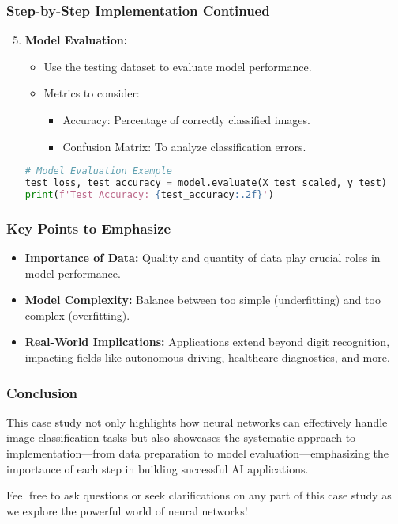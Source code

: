 \documentclass[aspectratio=169]{beamer}
\begin{document}
\begin{frame}[fragile]
    \frametitle{Step-by-Step Implementation Continued}
    \begin{enumerate}
        \setcounter{enumi}{4}
        \item \textbf{Model Evaluation:}
            \begin{itemize}
                \item Use the testing dataset to evaluate model performance.
                \item Metrics to consider:
                \begin{itemize}
                    \item Accuracy: Percentage of correctly classified images.
                    \item Confusion Matrix: To analyze classification errors.
                \end{itemize}
            \end{itemize}
            \begin{lstlisting}[language=Python]
# Model Evaluation Example
test_loss, test_accuracy = model.evaluate(X_test_scaled, y_test)
print(f'Test Accuracy: {test_accuracy:.2f}')
            \end{lstlisting}
    \end{enumerate}
\end{frame}

\begin{frame}
    \frametitle{Key Points to Emphasize}
    \begin{itemize}
        \item \textbf{Importance of Data:} Quality and quantity of data play crucial roles in model performance.
        \item \textbf{Model Complexity:} Balance between too simple (underfitting) and too complex (overfitting).
        \item \textbf{Real-World Implications:} Applications extend beyond digit recognition, impacting fields like autonomous driving, healthcare diagnostics, and more.
    \end{itemize}
\end{frame}

\begin{frame}
    \frametitle{Conclusion}
    This case study not only highlights how neural networks can effectively handle image classification tasks but also showcases the systematic approach to implementation—from data preparation to model evaluation—emphasizing the importance of each step in building successful AI applications.
    
    \begin{block}{}
        Feel free to ask questions or seek clarifications on any part of this case study as we explore the powerful world of neural networks!
    \end{block}
\end{frame}
\end{document}
